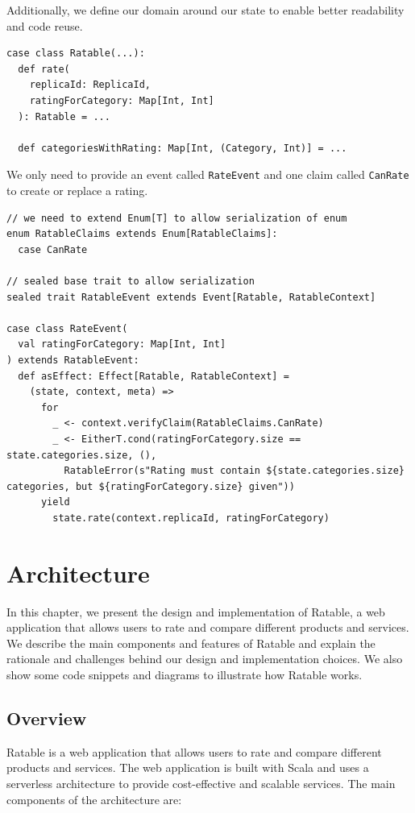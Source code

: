 \documentclass[
	english,
	ruledheaders=section,   %
	class=report,		    %
	thesis={type=bachelor}, %
	accentcolor=9c,			%
	custommargins=true,    %
	marginpar=false,        %
	parskip=half-,          %
	fontsize=11pt,          %
]{tudapub}
\begin{document}
Additionally, we define our domain around our state to enable better readability and code reuse.

\begin{lstlisting}
case class Ratable(...):
  def rate(
    replicaId: ReplicaId, 
    ratingForCategory: Map[Int, Int]
  ): Ratable = ...

  def categoriesWithRating: Map[Int, (Category, Int)] = ...
\end{lstlisting}

We only need to provide an event called \texttt{RateEvent} and one claim called \texttt{CanRate} to create or replace a rating.

\begin{lstlisting}
// we need to extend Enum[T] to allow serialization of enum
enum RatableClaims extends Enum[RatableClaims]:
  case CanRate

// sealed base trait to allow serialization
sealed trait RatableEvent extends Event[Ratable, RatableContext]

case class RateEvent(
  val ratingForCategory: Map[Int, Int]
) extends RatableEvent:
  def asEffect: Effect[Ratable, RatableContext] =
    (state, context, meta) =>
      for
        _ <- context.verifyClaim(RatableClaims.CanRate)
        _ <- EitherT.cond(ratingForCategory.size == state.categories.size, (),
          RatableError(s"Rating must contain ${state.categories.size} categories, but ${ratingForCategory.size} given"))
      yield
        state.rate(context.replicaId, ratingForCategory)
\end{lstlisting}

\chapter{Architecture}

In this chapter, we present the design and implementation of Ratable, a web application that allows users to rate and compare different products and services. We describe the main components and features of Ratable and explain the rationale and challenges behind our design and implementation choices. We also show some code snippets and diagrams to illustrate how Ratable works.

\section{Overview}

Ratable is a web application that allows users to rate and compare different products and services. The web application is built with Scala and uses a serverless architecture to provide cost-effective and scalable services. The main components of the architecture are:
\end{document}
